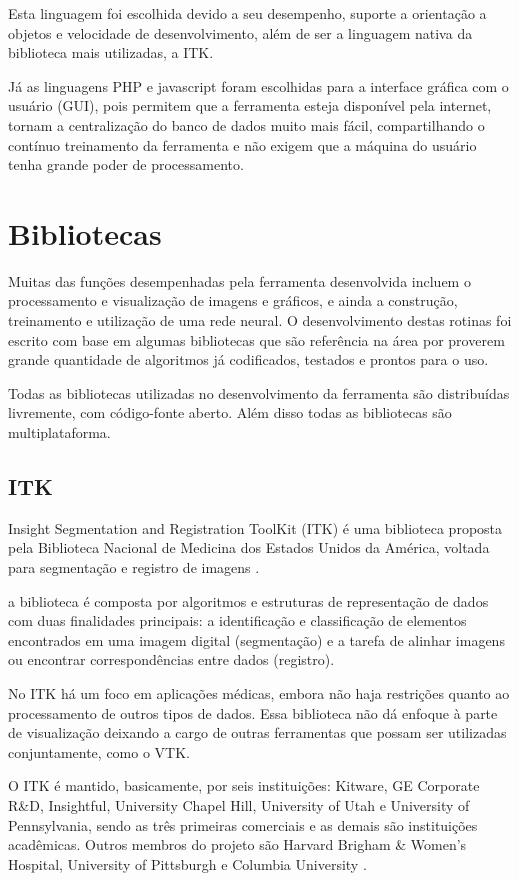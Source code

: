 Esta linguagem foi escolhida devido a seu desempenho, suporte a orientação a objetos e velocidade de desenvolvimento, além de ser a linguagem nativa da biblioteca mais utilizadas, a ITK.

Já as linguagens PHP e javascript foram escolhidas para a interface gráfica com o usuário (GUI), pois permitem que a ferramenta esteja disponível pela internet, tornam a centralização do banco de dados muito mais fácil, compartilhando o contínuo treinamento da ferramenta e não exigem que a máquina do usuário tenha grande poder de processamento.

\section{Bibliotecas}

Muitas das funções desempenhadas pela ferramenta desenvolvida incluem o processamento e visualização de imagens e gráficos, e ainda a construção, treinamento e utilização de uma rede neural. O desenvolvimento destas rotinas foi escrito com base em algumas bibliotecas que são referência na área por proverem grande quantidade de algoritmos já codificados, testados e prontos para o uso.

Todas as bibliotecas utilizadas no desenvolvimento da ferramenta são distribuídas livremente, com código-fonte aberto. Além disso todas as bibliotecas são multiplataforma.

\subsection{ITK}

Insight Segmentation and Registration ToolKit (ITK) é uma biblioteca proposta pela Biblioteca Nacional de Medicina dos Estados Unidos da América, voltada para segmentação e registro de imagens \cite{yoo}.

a biblioteca é composta por algoritmos e estruturas de representação de dados com duas finalidades principais: a identificação e classificação de elementos encontrados em uma imagem digital (segmentação) e a tarefa de alinhar imagens ou encontrar correspondências entre dados (registro).

No ITK há um foco em aplicações médicas, embora não haja restrições quanto ao processamento de outros tipos de dados. Essa biblioteca não dá enfoque à parte de visualização deixando a cargo de outras ferramentas que possam ser utilizadas conjuntamente, como o VTK.

O ITK é mantido, basicamente, por seis instituições: Kitware, GE Corporate R\&D, Insightful, University Chapel Hill, University of Utah e University of Pennsylvania, sendo as três primeiras comerciais e as demais são instituições acadêmicas. Outros membros do projeto são Harvard Brigham \& Women's Hospital, University of Pittsburgh e Columbia University \cite{itk-page}.

